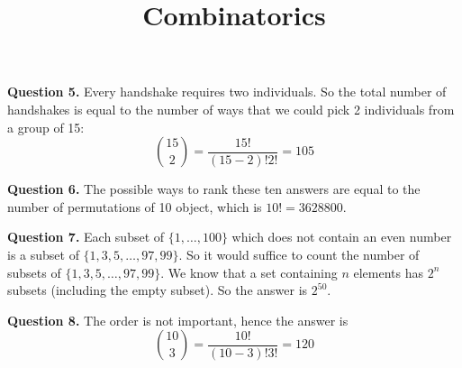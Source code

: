 \documentclass{ximera}
\title{Combinatorics}
\begin{document}
\maketitle

\textbf{Question 5.} Every handshake requires two individuals. So the total number of handshakes is equal to the number of ways that we could pick 2 individuals from a group of 15:
\begin{equation*}
\binom{15}{2} = \frac{15!}{(15 - 2)! 2!} = 105
\end{equation*}

\textbf{Question 6.} The possible ways to rank these ten answers are equal to the number of permutations of 10 object, which is $10! = 3628800$.

\textbf{Question 7.} Each subset of $\{1 , \ldots , 100\}$ which does not contain an even number is a subset of $\{1, 3, 5, \ldots , 97, 99\}$. So it would suffice to count the number of subsets of $\{1, 3, 5, \ldots , 97, 99\}$. We know that a set containing $n$ elements has $2^n$ subsets (including the empty subset). So the answer is $2^{50}$.

\textbf{Question 8.} The order is not important, hence the answer is
\begin{equation*}
\binom{10}{3} = \frac{10!}{(10-3)!3!} = 120
\end{equation*}
\end{document}
